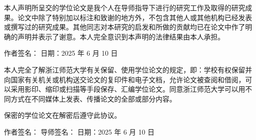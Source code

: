 \begin{flushleft}
  \begin{minipage}{15cm}
    \begin{OriginalityStatements}
      \setlength{\parindent}{2em}\xiaosi
      本人声明所呈交的学位论文是我个人在导师指导下进行的研究工作及取得的研究成果。论文中除了特别加以标注和致谢的地方外，不包含其他人或其他机构已经发表或撰写过的研究成果。其他同志对本研究的启发和所做的贡献均已在论文中作了明确的声明并表示了谢意。本人完全意识到本声明的法律结果由本人承担。
      \newline
      \newline

      \noindent
      作者签名：\hspace*{60pt}
      \hfill
      日期：\hspace*{40pt}2025
      年  \hspace*{20pt}6
      月  \hspace*{20pt}10 日
    \end{OriginalityStatements}

    \vspace{20ex}
    
    \begin{LicenseStatements}
      \setlength{\parindent}{2em}\xiaosi
      本人完全了解浙江师范大学有关保留、使用学位论文的规定，即：学校有权保留并向国家有关机关或机构送交论文的复印件和电子文档，允许论文被查阅和借阅，可以采用影印、缩印或扫描等手段保存、汇编学位论文。同意浙江师范大学可以用不同方式在不同媒体上发表、传播论文的全部或部分内容。
      
      保密的学位论文在解密后遵守此协议。
      \newline
      \newline

      \noindent
      作者签名：\hspace*{60pt}
      导师签名：\hfill
      日期：\hspace*{40pt}2025
      年 \hspace*{20pt}6
      月 \hspace*{20pt}10 日

    \end{LicenseStatements}
  \end{minipage}
\end{flushleft}